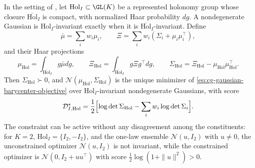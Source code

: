 In the setting of , let
\(\mathrm{Hol}_I\subset\GL(K)\) be a represented holonomy group whose closure
\(\overline{\mathrm{Hol}}_I\) is compact, with normalized Haar probability
\(dg\). A nondegenerate Gaussian is \(\mathrm{Hol}_I\)-invariant exactly when it
is \(\overline{\mathrm{Hol}}_I\)-invariant. Define
\begin{equation}
\bar\mu=\sum_i w_i\mu_i,\qquad
\Xi=\sum_i w_i(\Sigma_i+\mu_i\mu_i^\top),
\label{eq:cg-gaussian-raw-moments}
\end{equation}
and their Haar projections
\begin{equation}
\mu_{\mathrm{Hol}}
=\int_{\overline{\mathrm{Hol}}_I}g\bar\mu dg,\qquad
\Xi_{\mathrm{Hol}}
=\int_{\overline{\mathrm{Hol}}_I}g\Xi g^\top dg,\qquad
\Sigma_{\mathrm{Hol}}
=\Xi_{\mathrm{Hol}}-\mu_{\mathrm{Hol}}\mu_{\mathrm{Hol}}^\top .
\label{eq:cg-gaussian-haar-moments}
\end{equation}
Then \(\Sigma_{\mathrm{Hol}}\succ0\), and
\(\mathcal N(\mu_{\mathrm{Hol}},\Sigma_{\mathrm{Hol}})\) is the unique minimizer of
\eqref{eq:cg-gaussian-barycenter-objective} over \(\mathrm{Hol}_I\)-invariant
nondegenerate Gaussians, with score
\begin{equation}
\mathcal D_{I,\mathrm{Hol}}^\star
=\frac12\Bigl[
\log\det\Sigma_{\mathrm{Hol}}-\sum_i w_i\log\det\Sigma_i
\Bigr].
\label{eq:cg-gaussian-haar-score}
\end{equation}
The constraint can be active without any disagreement among the constituents:
for \(K=2\), \(\mathrm{Hol}_I=\{I_2,-I_2\}\), and the one-law ensemble
\(\mathcal N(u,I_2)\) with \(u\neq0\), the unconstrained optimizer
\(\mathcal N(u,I_2)\) is not invariant, while the constrained optimizer is
\(\mathcal N(0,I_2+uu^\top)\) with score \(\frac12\log(1+\|u\|^2)>0\).

